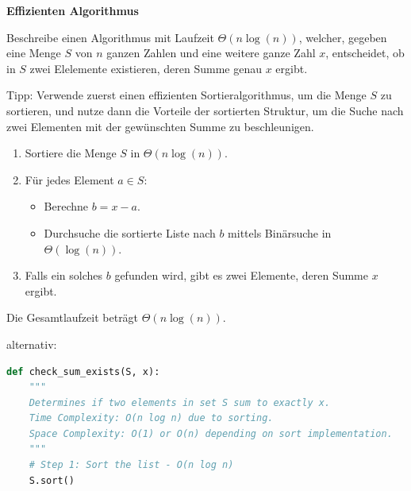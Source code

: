 \begin{questions}
\droptotalpoints

\question[2]\textbf{Effizienten Algorithmus}

Beschreibe einen Algorithmus mit Laufzeit $\Theta(n\log(n))$, welcher, gegeben eine Menge $S$ von $n$ ganzen Zahlen und eine weitere ganze Zahl $x$, entscheidet, ob in $S$ zwei Elelemente existieren, deren Summe genau $x$ ergibt.

Tipp: Verwende zuerst einen effizienten Sortieralgorithmus, um die Menge $S$ zu sortieren, und nutze dann die Vorteile der sortierten Struktur, um die Suche nach zwei Elementen mit der gewünschten Summe zu beschleunigen.

\begin{solution}
\begin{enumerate}
    \item Sortiere die Menge $S$ in $\Theta(n\log(n))$.
    \item Für jedes Element $a \in S$:
    \begin{itemize}
        \item Berechne $b = x - a$.
        \item Durchsuche die sortierte Liste nach $b$ mittels Binärsuche in $\Theta(\log(n))$.
    \end{itemize}
    \item Falls ein solches $b$ gefunden wird, gibt es zwei Elemente, deren Summe $x$ ergibt.
\end{enumerate}

Die Gesamtlaufzeit beträgt $\Theta(n\log(n))$.

alternativ:
\begin{lstlisting}[language=Python,numbers=none]
def check_sum_exists(S, x):
    """
    Determines if two elements in set S sum to exactly x.
    Time Complexity: O(n log n) due to sorting.
    Space Complexity: O(1) or O(n) depending on sort implementation.
    """
    # Step 1: Sort the list - O(n log n)
    S.sort()
    

\end{lstlisting}
\end{solution}
\end{questions}
